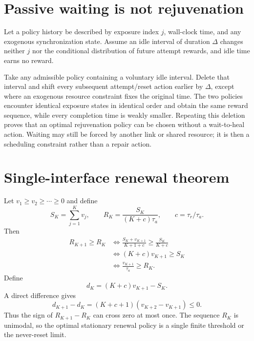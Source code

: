 \documentclass[aps,prx,preprint,superscriptaddress,nofootinbib,longbibliography]{revtex4-2}
\begin{document}
\section{Passive waiting is not rejuvenation}
Let a policy history be described by exposure index $j$, wall-clock time, and any exogenous synchronization state. Assume an idle interval of duration $\Delta$ changes neither $j$ nor the conditional distribution of future attempt rewards, and idle time earns no reward.

Take any admissible policy containing a voluntary idle interval. Delete that interval and shift every subsequent attempt/reset action earlier by $\Delta$, except where an exogenous resource constraint fixes the original time. The two policies encounter identical exposure states in identical order and obtain the same reward sequence, while every completion time is weakly smaller. Repeating this deletion proves that an optimal rejuvenation policy can be chosen without a wait-to-heal action. Waiting may still be forced by another link or shared resource; it is then a scheduling constraint rather than a repair action.

\section{Single-interface renewal theorem}
Let $v_1\ge v_2\ge\cdots\ge0$ and define
\begin{equation}
 S_K=\sum_{j=1}^{K}v_j,\qquad
 R_K=\frac{S_K}{(K+c)\tau_a},\qquad c=\tau_r/\tau_a.
\end{equation}
Then
\begin{align}
 R_{K+1}\ge R_K
 &\Longleftrightarrow
 \frac{S_K+v_{K+1}}{K+1+c}\ge\frac{S_K}{K+c}\\
 &\Longleftrightarrow (K+c)v_{K+1}\ge S_K\\
 &\Longleftrightarrow \frac{v_{K+1}}{\tau_a}\ge R_K.
\end{align}
Define
\begin{equation}
 d_K=(K+c)v_{K+1}-S_K.
\end{equation}
A direct difference gives
\begin{equation}
 d_{K+1}-d_K=(K+c+1)(v_{K+2}-v_{K+1})\le0.
\end{equation}
Thus the sign of $R_{K+1}-R_K$ can cross zero at most once. The sequence $R_K$ is unimodal, so the optimal stationary renewal policy is a single finite threshold or the never-reset limit.
\end{document}
